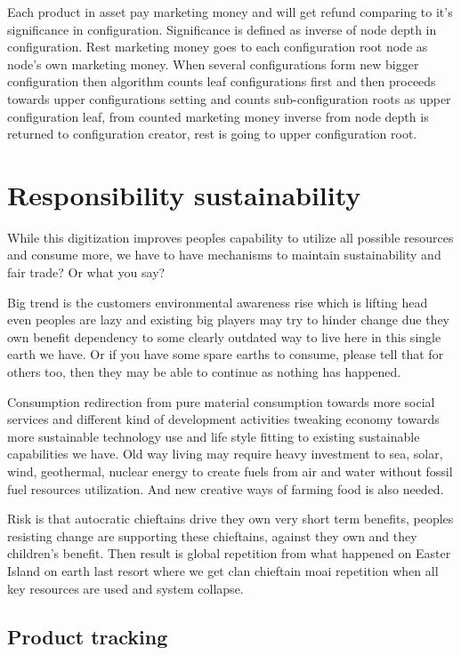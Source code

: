 Each product in asset pay marketing money and will get refund comparing to it's significance in configuration. Significance is defined as inverse of node depth in configuration. Rest marketing money goes to each configuration root node as node's own marketing money. When several configurations form new bigger configuration then algorithm counts leaf configurations first and then proceeds towards upper configurations setting and counts sub-configuration roots as upper configuration leaf, from counted marketing money inverse from node depth is returned to configuration creator, rest is going to upper configuration root.

\section{Responsibility sustainability}
\label{responsibility_sustainability}

While this digitization improves peoples capability to utilize all possible resources and consume more, we have to have mechanisms to maintain sustainability and fair trade? Or what you say?

Big trend is the customers environmental awareness rise which is lifting head even peoples are lazy and existing  big players may try to hinder change due they own  benefit dependency to some clearly outdated way to live here in this single earth we have. Or if you have some spare earths to consume, please tell that for others too, then they may be able to continue as nothing has happened.

Consumption redirection from pure material consumption towards more social services and different kind of development activities tweaking economy towards more sustainable technology use and life style fitting to existing sustainable capabilities we have. Old way living may require heavy investment to sea, solar, wind, geothermal, nuclear energy to create fuels from air and water without fossil fuel resources utilization. And new creative ways of farming food is also needed.

Risk is that autocratic chieftains drive they own very short term benefits, peoples resisting change are supporting these chieftains, against they own and they children's benefit. Then result is global repetition from what happened on Easter Island on earth last resort where we get clan chieftain moai repetition when all key resources are used and system collapse.

\subsection{Product tracking}
\label{product_tracking}

